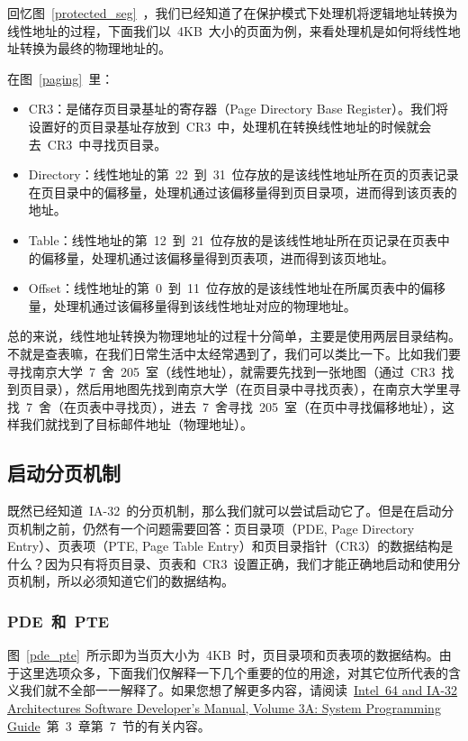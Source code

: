 回忆图~\ref{protected_seg}~，我们已经知道了在保护模式下处理机将逻辑地址转换为线性地址的过程，下面我们以~4KB~大小的页面为例，来看处理机是如何将线性地址转换为最终的物理地址的。


在图~\ref{paging}~里：
\begin{itemize}
\item CR3：是储存页目录基址的寄存器（Page Directory Base Register）。我们将设置好的页目录基址存放到~CR3~中，处理机在转换线性地址的时候就会去~CR3~中寻找页目录。
\item Directory：线性地址的第~22~到~31~位存放的是该线性地址所在页的页表记录在页目录中的偏移量，处理机通过该偏移量得到页目录项，进而得到该页表的地址。
\item Table：线性地址的第~12~到~21~位存放的是该线性地址所在页记录在页表中的偏移量，处理机通过该偏移量得到页表项，进而得到该页地址。
\item Offset：线性地址的第~0~到~11~位存放的是该线性地址在所属页表中的偏移量，处理机通过该偏移量得到该线性地址对应的物理地址。
\end{itemize}

总的来说，线性地址转换为物理地址的过程十分简单，主要是使用两层目录结构。不就是查表嘛，在我们日常生活中太经常遇到了，我们可以类比一下。比如我们要寻找南京大学~7~舍~205~室（线性地址），就需要先找到一张地图（通过~CR3~找到页目录），然后用地图先找到南京大学（在页目录中寻找页表），在南京大学里寻找~7~舍（在页表中寻找页），进去~7~舍寻找~205~室（在页中寻找偏移地址），这样我们就找到了目标邮件地址（物理地址）。


\subsection{启动分页机制}

既然已经知道~IA-32~的分页机制，那么我们就可以尝试启动它了。但是在启动分页机制之前，仍然有一个问题需要回答：页目录项（PDE, Page Directory Entry）、页表项（PTE, Page Table Entry）和页目录指针（CR3）的数据结构是什么？因为只有将页目录、页表和~CR3~设置正确，我们才能正确地启动和使用分页机制，所以必须知道它们的数据结构。

\subsubsection{PDE~和~PTE}

图~\ref{pde_pte}~所示即为当页大小为~4KB~时，页目录项和页表项的数据结构。由于这里选项众多，下面我们仅解释一下几个重要的位的用途，对其它位所代表的含义我们就不全部一一解释了。如果您想了解更多内容，请阅读~\href{http://download.intel.com/design/processor/manuals/253668.pdf}{Intel\textregistered~64 and IA-32 Architectures Software Developer's Manual, Volume 3A: System Programming Guide}~第~3~章第~7~节的有关内容。


